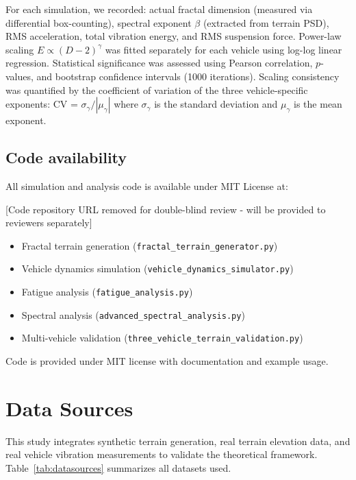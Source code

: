 \documentclass[11pt]{article}
\begin{document}
For each simulation, we recorded: actual fractal dimension (measured via differential box-counting), spectral exponent $\beta$ (extracted from terrain PSD), RMS acceleration, total vibration energy, and RMS suspension force. Power-law scaling $E \propto (D-2)^\gamma$ was fitted separately for each vehicle using log-log linear regression. Statistical significance was assessed using Pearson correlation, $p$-values, and bootstrap confidence intervals (1000 iterations). Scaling consistency was quantified by the coefficient of variation of the three vehicle-specific exponents: CV = $\sigma_\gamma / |\mu_\gamma|$ where $\sigma_\gamma$ is the standard deviation and $\mu_\gamma$ is the mean exponent.

\subsection*{Code availability}

All simulation and analysis code is available under MIT License at:

\begin{center}
[Code repository URL removed for double-blind review - will be provided to reviewers separately]
\end{center}

\begin{itemize}
\item Fractal terrain generation (\texttt{fractal\_\allowbreak terrain\_\allowbreak generator.py})
\item Vehicle dynamics simulation (\texttt{vehicle\_\allowbreak dynamics\_\allowbreak simulator.py})
\item Fatigue analysis (\texttt{fatigue\_\allowbreak analysis.py})
\item Spectral analysis (\texttt{advanced\_\allowbreak spectral\_\allowbreak analysis.py})
\item Multi-vehicle validation (\texttt{three\_\allowbreak vehicle\_\allowbreak terrain\_\allowbreak validation.py})
\end{itemize}

Code is provided under MIT license with documentation and example usage.


\section*{Data Sources}

This study integrates synthetic terrain generation, real terrain elevation data, and real vehicle vibration measurements to validate the theoretical framework. Table~\ref{tab:datasources} summarizes all datasets used.
\end{document}
